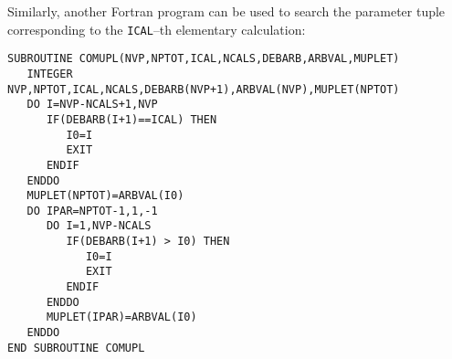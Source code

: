 \vskip 0.2cm

Similarly, another Fortran program can be used to search the parameter tuple corresponding to
the {\tt ICAL}--th elementary calculation:
\begin{verbatim}
SUBROUTINE COMUPL(NVP,NPTOT,ICAL,NCALS,DEBARB,ARBVAL,MUPLET)
   INTEGER NVP,NPTOT,ICAL,NCALS,DEBARB(NVP+1),ARBVAL(NVP),MUPLET(NPTOT)
   DO I=NVP-NCALS+1,NVP
      IF(DEBARB(I+1)==ICAL) THEN
         I0=I
         EXIT
      ENDIF
   ENDDO
   MUPLET(NPTOT)=ARBVAL(I0)
   DO IPAR=NPTOT-1,1,-1
      DO I=1,NVP-NCALS
         IF(DEBARB(I+1) > I0) THEN
            I0=I
            EXIT
         ENDIF
      ENDDO
      MUPLET(IPAR)=ARBVAL(I0)
   ENDDO
END SUBROUTINE COMUPL
\end{verbatim}

\clearpage
